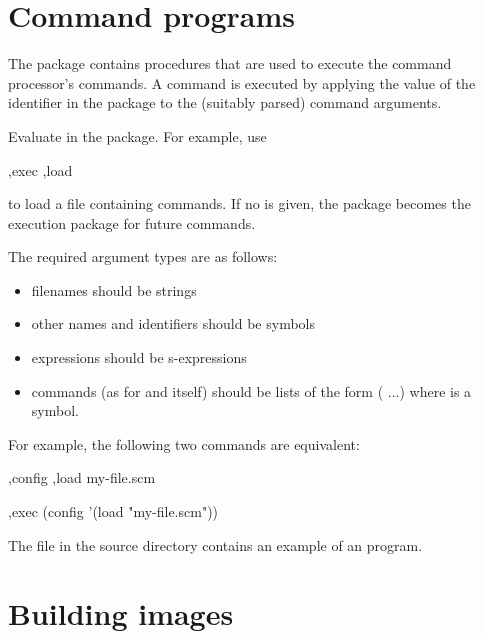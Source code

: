 \section{Command programs}
\label{command-programs}

The  package contains procedures that are used
 to execute the command processor's commands.
A command  is executed by applying the value of
 the identifier  in the  package to
 the (suitably parsed) command arguments.

\begin{description}
\item {}
   Evaluate  in the  package.
   For example, use
\begin{example}
,exec ,load 
\end{example}
to load a file containing commands.
If no  is given, the  package becomes the
 execution package for future commands.
\end{description}

The required argument types are as follows:
\begin{itemize}
\item filenames should be strings
\item other names and identifiers should be symbols
\item expressions should be s-expressions
\item commands (as for  and  itself)
 should be lists of the form \code(  ...)
 where  is a symbol.
\end{itemize}

For example, the following two commands are equivalent:
\begin{example}
,config ,load my-file.scm

,exec (config '(load "my-file.scm"))
\end{example}

The file  in the source directory contains an
 example of an  program.

\section{Building images}

